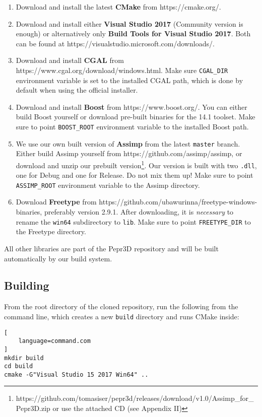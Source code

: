 \begin{enumerate}
\item Download and install the latest \textbf{CMake} from https://cmake.org/.
\item Download and install either \textbf{Visual Studio 2017} (Community version is enough) or alternatively only \textbf{Build Tools for Visual Studio 2017}. Both can be found at https://visualstudio.microsoft.com/downloads/.
\item Download and install \textbf{CGAL} from https://www.cgal.org/\-download/\-win\-dows.html. Make sure \texttt{CGAL\_DIR} environment variable is set to the installed CGAL path, which is done by default when using the official installer.
\item Download and install \textbf{Boost} from https://www.boost.org/. You can either build Boost yourself or download pre-built binaries for the 14.1 toolset. Make sure to point \texttt{BOOST\_ROOT} environment variable to the installed Boost path.
\item We use our own built version of \textbf{Assimp} from the latest \texttt{master} branch. Either build Assimp yourself from https://github.com/assimp/assimp, or download and unzip our prebuilt version\footnote{https://github.com/tomasiser/pepr3d/releases/download/v1.0/Assimp\_for\_Pepr3D.zip or use the attached CD (see Appendix II)}. Our version is built with two \texttt{.dll}, one for Debug and one for Release. Do not mix them up! Make sure to point \texttt{ASSIMP\_ROOT} environment variable to the Assimp directory.
\item Download \textbf{Freetype} from https://github.com/\-ubawurinna/\-freetype-\-win\-dows-\-binaries, preferably version 2.9.1. After downloading, it is \emph{necessary} to rename the \texttt{win64} subdirectory to \texttt{lib}. Make sure to point \texttt{FREETYPE\_DIR} to the Freetype directory.
\end{enumerate}

All other libraries are part of the Pepr3D repository and will be built automatically by our build system.

\subsection{Building}

From the root directory of the cloned repository, run the following from the command line, which creates a new \texttt{build} directory and runs CMake inside:

\begin{lstlisting}[
    language=command.com
]
mkdir build
cd build
cmake -G"Visual Studio 15 2017 Win64" ..
\end{lstlisting}


